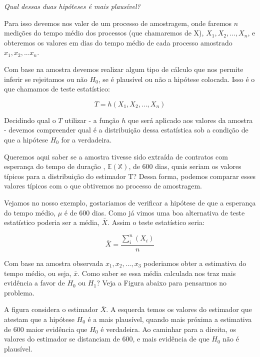 \documentclass[
  letterpaper,
  DIV=11,
  numbers=noendperiod]{scrreprt}
\begin{document}
\emph{Qual dessas duas hipóteses é mais plausível?}

Para isso devemos nos valer de um processo de amostragem, onde faremos
\(n\) medições do tempo médio dos processos (que chamaremos de X),
\(X_1, X_2, ..., X_n\), e obteremos os valores em dias do tempo médio de
cada processo amostrado \(x_1, x_2,...x_n\).

Com base na amostra devemos realizar algum tipo de cálculo que nos
permite inferir se rejeitamos ou não \(H_0\), se é plausível ou não a
hipótese colocada. Isso é o que chamamos de teste estatístico:

\[T = h(X_1,X_2, . . .,X_n)\]

Decidindo qual o \(T\) utilizar - a função \(h\) que será aplicado aos
valores da amostra - devemos compreender qual é a distribuição dessa
estatística sob a condição de que a hipótese \(H_0\) for a verdadeira.

\begin{tcolorbox}[enhanced jigsaw, titlerule=0mm, colback=white, coltitle=black, opacityback=0, breakable, colbacktitle=quarto-callout-note-color!10!white, toprule=.15mm, colframe=quarto-callout-note-color-frame, toptitle=1mm, bottomtitle=1mm, opacitybacktitle=0.6, left=2mm, arc=.35mm, rightrule=.15mm, bottomrule=.15mm, leftrule=.75mm, title=\textcolor{quarto-callout-note-color}{\faInfo}\hspace{0.5em}{A Intuição}]

Queremos aqui saber se a amostra tivesse sido extraída de contratos com
esperança do tempo de duração , \(\mathbb{E(X)}\), de 600 dias, quais
seriam os valores típicos para a distribuição do estimador T? Dessa
forma, podemos comparar esses valores típicos com o que obtivemos no
processo de amostragem.

\end{tcolorbox}

Vejamos no nosso exemplo, gostariamos de verificar a hipótese de que a
esperança do tempo médio, \(\mu\) é de 600 dias. Como já vimos uma boa
alternativa de teste estatístico poderia ser a média, \(\bar{X}\). Assim
o teste estatístico seria:

\[\bar{X} = \frac{\sum_i^n(X_i)}{n}\]

Com base na amostra observada \(x_1, x_2, ..., x_3\) poderiamos obter a
estimativa do tempo médio, ou seja, \(\bar{x}\). Como saber se essa
média calculada nos traz mais evidência a favor de \(H_0\) ou \(H_1\)?
Veja a Figura abaixo para pensarmos no problema.

A figura considera o estimador \(\bar{X}\). A esquerda temos os valores
do estimador que atestam que a hipótese \(H_0\) é a mais plausível,
quando mais próxima a estimativa de 600 maior evidência que \(H_0\) é
verdadeira. Ao caminhar para a direita, os valores do estimador se
distanciam de 600, e mais evidência de que \(H_0\) não é plausível.
\end{document}
